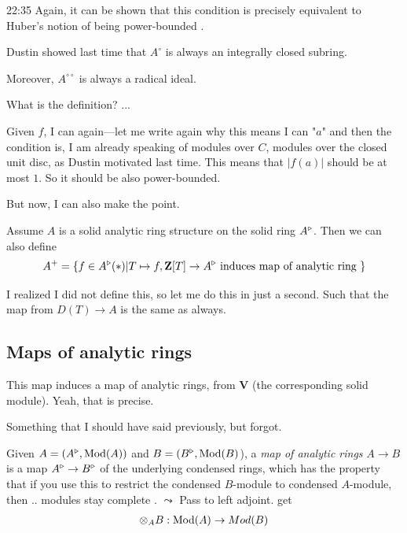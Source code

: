 \begin{unfinished}{22:35}
Again, it can be shown that this condition is precisely equivalent to Huber's notion of being power-bounded .

Dustin showed last time that $A^\circ$ is always an integrally closed subring.

Moreover, $A^{\circ\circ}$ is always a radical ideal. 

\ques What is the definition? ...

\ans Given $f$, I can again---let me write again why this means I can "$a$" and then the condition is, I am already speaking of modules over $C$, modules over the closed unit disc, as Dustin motivated last time. This means that $\lvert f(a) \rvert$ should be at most $1$. So it should be also power-bounded.

But now, I can also make the point.

\begin{definition}
Assume $A$ is a solid analytic ring structure on the solid ring $A^\triangleright$. Then we can also define 
\begin{align*}
A^{+} = \{ f \in A^\tri(\ast) | T \mapsto f, \Z[T] \to A^\tri \text{ induces map of analytic ring } \} %
\end{align*}
\end{definition}

I realized I did not define this, so let me do this in just a second. Such that the map from $D(T) \to A$ is the same as always.

\subsection{Maps of analytic rings}

This map induces a map of analytic rings, from $\mathbf{V}$ (the corresponding solid module). Yeah, that is precise.

Something that I should have said previously, but forgot.

Given $A = (A^\triangleright, \operatorname{Mod}(A))$ and $B = (B^\triangleright, \operatorname{Mod}(B)$), a \textit{map of analytic rings} $A \to B$ is a map $A^\triangleright \to B^\triangleright$ of the underlying condensed rings, which has the property that if you use this to restrict the condensed $B$-module to condensed $A$-module, then .. modules stay complete .
$\leadsto$ Pass to left adjoint. get 
\begin{align*}
\tnsr_A B: \Mod(A) \to Mod(B) %
\end{align*}


\end{unfinished}
